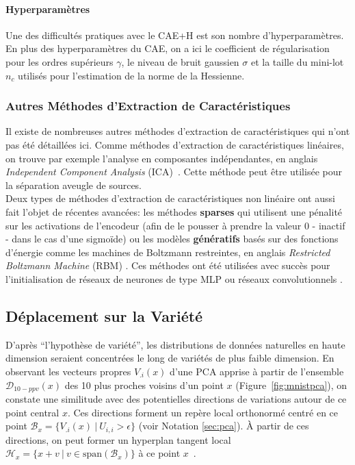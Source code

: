 \paragraph{Hyperparamètres} Une des difficultés pratiques avec le CAE+H est son nombre
d'hyperparamètres. En plus des hyperparamètres du CAE, on a ici le coefficient
de régularisation pour les ordres supérieurs $\gamma$, le niveau de bruit
gaussien $\sigma$ et la taille du mini-lot $n_c$ utilisés pour l'estimation de
la norme de la Hessienne.

\subsubsection{Autres Méthodes d'Extraction de Caractéristiques}

Il existe de nombreuses autres méthodes d'extraction de caractéristiques qui
n'ont pas été détaillées ici. Comme méthodes d'extraction de caractéristiques
linéaires, on trouve par exemple l'analyse en composantes indépendantes, en
anglais \textit{Independent Component Analysis} (ICA)~\citep{Comon94,Hyvarinen-2001}.
Cette méthode peut être utilisée pour la séparation aveugle de sources.  \\

Deux types de méthodes d'extraction de caractéristiques non linéaire  ont aussi
fait l'objet de récentes avancées: les méthodes {\bf sparses}
\citep{ranzato-08,koray-psd-08,Koray-08} qui utilisent une pénalité sur les
activations de l'encodeur (afin de le pousser à prendre la valeur $0$ - inactif
- dans le cas d'une sigmoïde)  ou les modèles {\bf génératifs} basés sur des
  fonctions d'énergie \citep{ranzato-unsup-07} comme les machines de Boltzmann
  restreintes, en anglais \textit{Restricted Boltzmann Machine} (RBM)
  \citep{Tieleman08}.  Ces méthodes ont été utilisées avec succès pour
  l'initialisation de réseaux de neurones de type MLP
  \citep{HintonG2006,ranzato-08,koray-psd-08,Koray-08} ou réseaux
  convolutionnels \citep{koray-nips-10-small}. 

\subsection{Déplacement sur la Variété}
\label{sec:surfing}

D'après ``l'hypothèse de variété'', les distributions de données naturelles en
haute dimension seraient concentrées le long de variétés de plus faible
dimension.  En observant les vecteurs propres $V_{.i}(x)$ d'une PCA apprise à
partir de l'ensemble $\mathcal{D}_{10-ppv}(x)$ des 10 plus proches voisins d'un
point $x$ (Figure~\ref{fig:mnistpca}), on constate une similitude avec des
potentielles directions de variations autour de ce point central $x$.  Ces
directions forment un repère local orthonormé centré en ce point
$\mathcal{B}_{x}=\lbrace V_{.i}(x)~|~U_{i,i} > \epsilon\rbrace$ (voir Notation
\ref{sec:pca}). À partir de ces directions, on peut former un hyperplan tangent
local $\mathcal{H}_{x}=\lbrace x + v~|~v\in \textrm{span} (\mathcal{B}_{x}) \rbrace$ à ce point
$x$~\citep{Dauphin-et-al-NIPS2011}.

